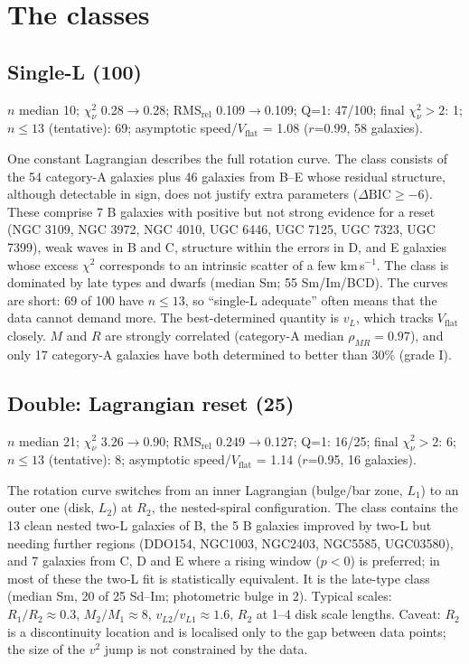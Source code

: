 \documentclass[10pt]{article}
\begin{document}
\section{The classes}
\subsection{Single-L (100)}
$n$ median 10; $\chi^2_\nu$ 0.28$\to$0.28; RMS$_\mathrm{rel}$ 0.109$\to$0.109; Q=1: 47/100; final $\chi^2_\nu>2$: 1; $n\le13$ (tentative): 69; asymptotic speed/$V_\mathrm{flat}$ = 1.08 ($r$=0.99, 58 galaxies).

One constant Lagrangian describes the full rotation curve. The class consists of the 54 category-A galaxies plus 46 galaxies from B--E whose residual structure, although detectable in sign, does not justify extra parameters ($\Delta\mathrm{BIC}\ge-6$). These comprise 7 B galaxies with positive but not strong evidence for a reset (NGC 3109, NGC 3972, NGC 4010, UGC 6446, UGC 7125, UGC 7323, UGC 7399), weak waves in B and C, structure within the errors in D, and E galaxies whose excess $\chi^2$ corresponds to an intrinsic scatter of a few km\,s$^{-1}$. The class is dominated by late types and dwarfs (median Sm; 55 Sm/Im/BCD). The curves are short: 69 of 100 have $n\le13$, so ``single-L adequate'' often means that the data cannot demand more. The best-determined quantity is $v_L$, which tracks $V_\mathrm{flat}$ closely. $M$ and $R$ are strongly correlated (category-A median $\rho_{MR}=0.97$), and only 17 category-A galaxies have both determined to better than 30\% (grade I).

\subsection{Double: Lagrangian reset (25)}
$n$ median 21; $\chi^2_\nu$ 3.26$\to$0.90; RMS$_\mathrm{rel}$ 0.249$\to$0.127; Q=1: 16/25; final $\chi^2_\nu>2$: 6; $n\le13$ (tentative): 8; asymptotic speed/$V_\mathrm{flat}$ = 1.14 ($r$=0.95, 16 galaxies).

The rotation curve switches from an inner Lagrangian (bulge/bar zone, $L_1$) to an outer one (disk, $L_2$) at $R_2$, the nested-spiral configuration. The class contains the 13 clean nested two-L galaxies of B, the 5 B galaxies improved by two-L but needing further regions (DDO154, NGC1003, NGC2403, NGC5585, UGC03580), and 7 galaxies from C, D and E where a rising window ($p<0$) is preferred; in most of these the two-L fit is statistically equivalent. It is the late-type class (median Sm, 20 of 25 Sd--Im; photometric bulge in 2). Typical scales: $R_1/R_2\approx0.3$, $M_2/M_1\approx8$, $v_{L2}/v_{L1}\approx1.6$, $R_2$ at 1--4 disk scale lengths. Caveat: $R_2$ is a discontinuity location and is localised only to the gap between data points; the size of the $v^2$ jump is not constrained by the data.
\end{document}
